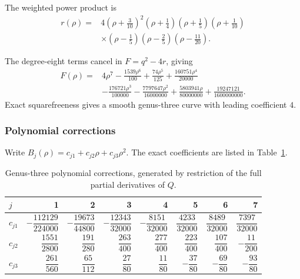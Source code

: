 \documentclass[11pt]{article}
\begin{document}
The weighted power product is
\begin{equation}\label{ex:g3-r}
\begin{aligned}r(\rho)={}&4\left(\rho + \frac{3}{10}\right)^{2}\left(\rho + \frac{1}{4}\right)\left(\rho + \frac{1}{5}\right)\left(\rho + \frac{1}{10}\right)\\&\times \left(\rho - \frac{1}{5}\right)\left(\rho - \frac{2}{5}\right)\left(\rho - \frac{11}{20}\right).\end{aligned}
\end{equation}

The degree-eight terms cancel in $F=q^2-4r$, giving
\begin{equation}\label{ex:g3-F}
\begin{aligned}F(\rho)={}&4 \rho^{7} - \frac{1539 \rho^{6}}{100} + \frac{74 \rho^{5}}{125} + \frac{160751 \rho^{4}}{20000}\\&- \frac{176721 \rho^{3}}{100000} - \frac{7797647 \rho^{2}}{16000000} + \frac{5803941 \rho}{80000000} + \frac{19247121}{1600000000}.\end{aligned}
\end{equation}
Exact squarefreeness gives a smooth genus-three curve with leading coefficient $4$.

\subsubsection{Polynomial corrections}

Write $B_j(\rho)=c_{j1}+c_{j2}\rho+c_{j3}\rho^2$. The exact coefficients are listed in Table~\ref{tab:g3-gauges}.

\begin{table}[htbp]
\centering
\begingroup
\normalsize
\renewcommand{\arraystretch}{1.4}
\setlength{\tabcolsep}{7pt}
\begin{tabular}{lrrrrrrr}\toprule
$j$ & 1 & 2 & 3 & 4 & 5 & 6 & 7\\\midrule
$c_{j1}$ & $- \dfrac{112129}{224000}$ & $- \dfrac{19673}{44800}$ & $- \dfrac{12343}{32000}$ & $- \dfrac{8151}{32000}$ & $\dfrac{4233}{32000}$ & $\dfrac{8489}{32000}$ & $\dfrac{7397}{32000}$\\[8pt]
$c_{j2}$ & $\dfrac{1551}{2800}$ & $\dfrac{191}{280}$ & $\dfrac{263}{400}$ & $\dfrac{277}{400}$ & $\dfrac{223}{400}$ & $\dfrac{107}{400}$ & $- \dfrac{11}{200}$\\[8pt]
$c_{j3}$ & $\dfrac{261}{560}$ & $\dfrac{65}{112}$ & $\dfrac{27}{80}$ & $\dfrac{11}{80}$ & $- \dfrac{37}{80}$ & $- \dfrac{69}{80}$ & $- \dfrac{93}{80}$\\[4pt]
\bottomrule\end{tabular}
\endgroup
\caption{Genus-three polynomial corrections, generated by restriction of the full partial derivatives of $Q$.}\label{tab:g3-gauges}
\end{table}
\end{document}
